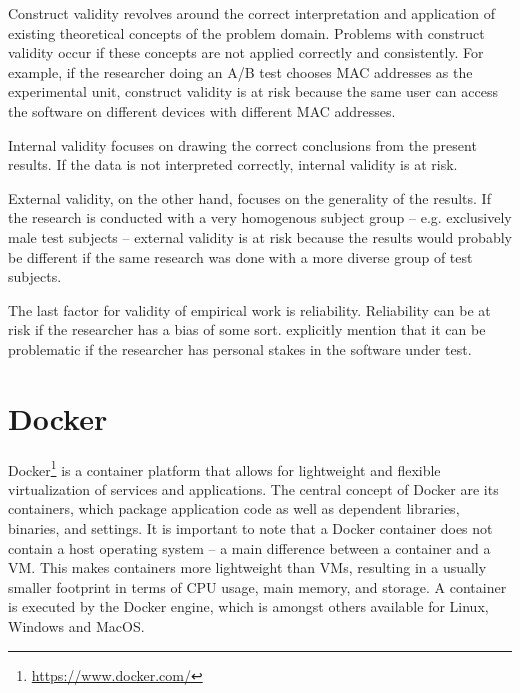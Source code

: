 Construct validity revolves around the correct interpretation and application of existing theoretical concepts of the problem domain.
Problems with construct validity occur if these concepts are not applied correctly and consistently.
For example, if the researcher doing an A/B test chooses MAC addresses as the experimental unit, construct validity is at risk because the same user can access the software on different devices with different MAC addresses.

Internal validity focuses on drawing the correct conclusions from the present results.
If the data is not interpreted correctly, internal validity is at risk.

External validity, on the other hand, focuses on the generality of the results.
If the research is conducted with a very homogenous subject group -- e.g. exclusively male test subjects -- external validity is at risk because the results would probably be different if the same research was done with a more diverse group of test subjects.

The last factor for validity of empirical work is reliability.
Reliability can be at risk if the researcher has a bias of some sort.
\citeauthor{Easterbrook2008} explicitly mention that it can be problematic if the researcher has personal stakes in the software under test.

\section{Docker}
\label{sec:fundamentals:docker}

Docker\footnote{\url{https://www.docker.com/}} is a container platform that allows for lightweight and flexible virtualization of services and applications.
The central concept of Docker are its containers, which package application code as well as dependent libraries, binaries, and settings.
It is important to note that a Docker container does not contain a host operating system -- a main difference between a container and a \ac{VM}.
This makes containers more lightweight than \ac{VM}s, resulting in a usually smaller footprint in terms of CPU usage, main memory, and storage.
A container is executed by the Docker engine, which is amongst others available for Linux, Windows and MacOS.

